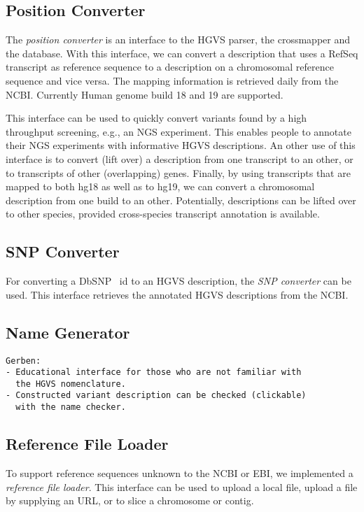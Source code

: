 \documentclass{article}
\begin{document}
\subsection{Position Converter} \label{subsec:positionconvert}
The \emph{position converter} is an interface to the HGVS parser, the
cross\-mapper and the database. With this interface, we can convert a
description that uses a RefSeq transcript as reference sequence to a
description on a chromosomal reference sequence and vice versa. The mapping
information is retrieved daily from the NCBI. Currently Human genome build 18
and 19 are supported.

This interface can be used to quickly convert variants found by a high
throughput screening, e.g., an NGS experiment. This enables people to annotate
their NGS experiments with informative HGVS descriptions. An other use of this
interface is to convert (lift over) a description from one transcript to an
other, or to transcripts of other (overlapping) genes. Finally, by using
transcripts that are mapped to both hg18 as well as to hg19, we can convert a
chromosomal description from one build to an other. Potentially, descriptions
can be lifted over to other species, provided cross-species transcript
annotation is available.

\subsection{SNP Converter} \label{subsec:snpconvert}
For converting a DbSNP~\cite{DBSNP} id to an HGVS description, the \emph{SNP
converter} can be used. This interface retrieves the annotated HGVS
descriptions from the NCBI.

\subsection{Name Generator}
\begin{verbatim}
Gerben:
- Educational interface for those who are not familiar with
  the HGVS nomenclature.
- Constructed variant description can be checked (clickable)
  with the name checker.
\end{verbatim}

\subsection{Reference File Loader}
To support reference sequences unknown to the NCBI or EBI, we implemented a
\emph{reference file loader}. This interface can be used to upload a local
file, upload a file by supplying an URL, or to slice a chromosome or contig.
\end{document}
